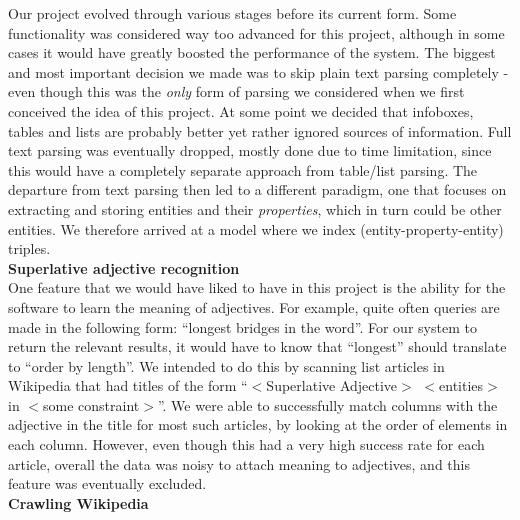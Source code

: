 \documentclass[11pt,twocolumn]{article}
\begin{document}
Our project evolved through various stages before its current form. Some functionality was considered way too advanced for this project, although in some cases it would have greatly boosted the performance of the system. The biggest and most important decision we made was to skip plain text parsing completely - even though this was the \emph{only} form of parsing we considered when we first conceived the idea of this project. At some point we decided that infoboxes, tables and lists are probably better yet rather ignored sources of information. Full text parsing was eventually dropped, mostly done due to time limitation, since this would have a completely separate approach from table/list parsing. The departure from text parsing then led to a different paradigm, one that focuses on extracting and storing entities and their \emph{properties}, which in turn could be other entities. We therefore arrived at a model where we index (entity-property-entity) triples.  \\

{\bf Superlative adjective recognition}\\

One feature that we would have liked to have in this project is the ability for the software to learn the meaning of adjectives. For example, quite often queries are made in the following form: ``longest bridges in the word''. For our system to return the relevant results, it would have to know that ``longest'' should translate to ``order by length''. We intended to do this by scanning list articles in Wikipedia that had titles of the form ``$<$Superlative Adjective$>$ $<$entities$>$ in $<$some constraint$>$''. We were able to successfully match columns with the adjective in the title for most such articles, by looking at the order of elements in each column. However, even though this had a very high success rate for each article, overall the data was noisy to attach meaning to adjectives, and this feature was eventually excluded.\\


{\bf Crawling Wikipedia}\\
\end{document}
